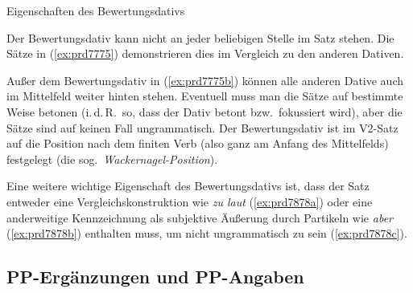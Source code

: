 \begin{Vertiefung}{Eigenschaften des Bewertungsdativs}
  
  \label{vert:djwackernagel}

\noindent Der Bewertungsdativ kann nicht an jeder beliebigen Stelle im Satz stehen.
Die Sätze in (\ref{ex:prd7775}) demonstrieren dies im Vergleich zu den anderen Dativen.

\begin{exe}
  \ex\label{ex:prd7775}
  \begin{xlist}
  \end{xlist}
\end{exe}

Außer dem Bewertungsdativ in (\ref{ex:prd7775b}) können alle anderen Dative auch im Mittelfeld weiter hinten stehen.
Eventuell muss man die Sätze auf bestimmte Weise betonen (i.\,d.\,R.\ so, dass der Dativ betont bzw.\ fokussiert wird), aber die Sätze sind auf keinen Fall ungrammatisch.
Der Bewertungsdativ ist im V2-Satz auf die Position nach dem finiten Verb (also ganz am Anfang des Mittelfelds) festgelegt (die sog.\ \textit{Wackernagel-Position}).

Eine weitere wichtige Eigenschaft des Bewertungsdativs ist, dass der Satz entweder eine Vergleichskonstruktion wie \textit{zu laut} (\ref{ex:prd7878a}) oder eine anderweitige Kennzeichnung als subjektive Äußerung durch Partikeln wie \textit{aber} (\ref{ex:prd7878b}) enthalten muss, um nicht ungrammatisch zu sein (\ref{ex:prd7878c}).

\begin{exe}
  \ex\label{ex:prd7878} 
  \begin{xlist}
  \end{xlist}
\end{exe}

\end{Vertiefung}

\subsection{PP-Ergänzungen und PP-Angaben}

